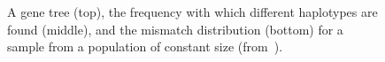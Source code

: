 \begin{figure}
\begin{center}
\end{center}
\caption{A gene tree (top), the frequency with which different
  haplotypes are found (middle), and the mismatch distribution
  (bottom) for a sample from a population of constant size
  (from~\cite{Harpending-etal-1998}).}\label{fig:mismatch-constant} 
\end{figure}

